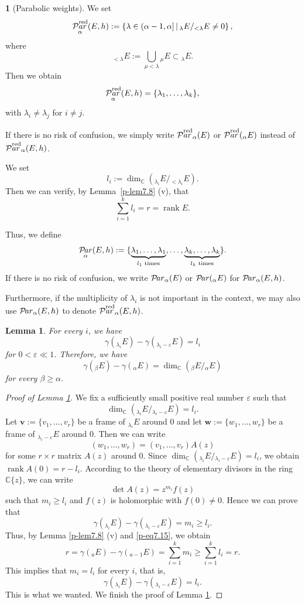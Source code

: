 \documentclass[12pt,twoside]{amsart}
\DeclareMathOperator{\rank}{rank}
\DeclareMathOperator{\Par}{\mathcal{P}\!\it{ar}}
\DeclareMathOperator{\Parr}{\mathcal{P}{\overset{\mathrm{red}}{\!\it{ar}}}}
\newtheorem{lem}[thm]{Lemma}
\theoremstyle{definition}
\newtheorem{say}[thm]{}
\begin{document}
\begin{say}[Parabolic weights]\label{p-say7.11}
We set
\[
\Parr_\alpha(E, h) := \left\{ \lambda \in (\alpha - 1, \alpha] \,\middle|\,
{}_\lambda E / {}_{<\lambda}E \neq 0 \right\},
\]
where
\[
{}_{<\lambda} E := \bigcup_{\mu < \lambda} {}_\mu E \subset {}_\lambda E.
\]
Then we obtain
\[
\Parr_\alpha(E, h) = \{ \lambda_1, \ldots, \lambda_k \},
\]
with $\lambda_i \neq \lambda_j$ for $i \neq j$.

If there is no risk of confusion, 
we simply write $\Parr_\alpha(E)$ or $\Parr({}_\alpha E)$ instead of $\Parr_\alpha(E, h)$.

We set
\[
l_i := \dim_{\mathbb{C}}\left({}_{\lambda_i}E / {}_{<\lambda_i}E\right).
\]
Then we can verify, by Lemma~\ref{p-lem7.8} (v), that
\begin{equation}\label{p-eq7.15}
\sum_{i=1}^k l_i = r = \rank E.
\end{equation}

Thus, we define
\[
\Par_\alpha(E, h) := \{\underbrace{\lambda_1, \ldots, \lambda_1}_{l_1\text{ times}}, \ldots,
\underbrace{\lambda_k, \ldots, \lambda_k}_{l_k\text{ times}}\}.
\]
If there is no risk of confusion, 
we write $\Par_\alpha(E)$ or $\Par({}_\alpha E)$ for $\Par_\alpha(E, h)$.

Furthermore, if the multiplicity 
of $\lambda_i$ is not important in the 
context, we may also use $\Par_\alpha(E, h)$ to 
denote $\Parr_\alpha(E, h)$.
\end{say}

\begin{lem}\label{p-lem7.12}
For every $i$, we 
have 
\[\gamma ({}_{\lambda_i}E)-\gamma ({}_{\lambda_i -\varepsilon}E)=l_i
\] 
for $0<\varepsilon \ll 1$. 
Therefore, we have 
\[
\gamma ({}_\beta E)-\gamma ({}_\alpha E)=\dim _{\mathbb C} 
\left({}_\beta E/{}_\alpha E\right)
\] 
for every $\beta\geq \alpha$. 
\end{lem}

\begin{proof}[Proof of Lemma \ref{p-lem7.12}]
We fix a sufficiently small positive real number $\varepsilon$ such that 
\[\dim _{\mathbb C} ({}_{\lambda_i}E/{}_{\lambda_i-\varepsilon} E)=l_i.
\] 
Let $\bm v:=\{v_1, \ldots, v_r\}$ be a frame 
of ${}_{\lambda_i} E$ around $0$ and let 
$\bm w:=\{w_1, \ldots, w_r\}$ be a frame of 
${}_{\lambda_i-\varepsilon} E$ around $0$. 
Then we can write 
\[
(w_1, \ldots, w_r)=(v_1, \ldots, v_r)A(z)
\] 
for some $r\times r$ matrix $A(z)$ around $0$. 
Since $\dim _{\mathbb C} ({}_{\lambda_i}E/{}_{\lambda_i-\varepsilon} E)=l_i$, 
we obtain $\rank A(0)=r-l_i$. 
According to the theory of elementary divisors in the ring $\mathbb{C}\{z\}$, 
we can write 
\[
\det A(z)=z^{m_i}f(z)
\] 
such that $m_i\geq l_i$ and $f(z)$ is holomorphic with $f(0)\ne 0$. 
Hence we can prove that 
\[
\gamma ({}_{\lambda_i} E)-\gamma ({}_{\lambda_i-\varepsilon} E)
=m_i\geq l_i. 
\] 
Thus, by Lemma \ref{p-lem7.8} (v) and 
\eqref{p-eq7.15}, we obtain 
\[
r=\gamma ({}_a E)-\gamma ({}_{a-1}E)=\sum _{i=1}^k m_i \geq 
\sum _{i=1}^k l_i=r. 
\] 
This implies that $m_i=l_i$ for every $i$, that is, 
\[\gamma ({}_{\lambda_i}E)-\gamma ({}_{\lambda_i -\varepsilon}E)=l_i. 
\] 
This is what we wanted. We finish the proof of Lemma \ref{p-lem7.12}. 
\end{proof}
\end{document}
